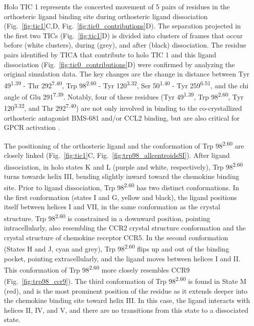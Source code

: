 Holo TIC 1 represents the concerted movement of 5 pairs of residues in the orthosteric ligand binding site during orthosteric ligand dissociation (Fig.~\ref{fig:tic1}C,D, Fig.~\ref{fig:tic0_contributions}D).
The separation projected in the first two TICs (Fig.~\ref{fig:tic1}D) is divided into clusters of frames that occur before (white clusters), during (grey), and after (black) dissociation.
The residue pairs identified by TICA that contribute to holo TIC 1 and this ligand dissociation (Fig.~\ref{fig:tic0_contributions}D) were confirmed by analyzing the original simulation data.
The key changes are the change in distance between Tyr 49\textsuperscript{1.39} - Thr 292\textsuperscript{7.40}, Trp 98\textsuperscript{2.60} - Tyr 120\textsuperscript{3.32}, Ser 50\textsuperscript{1.40} - Tyr 259\textsuperscript{6.51}, and the chi angle of Glu 291\textsuperscript{7.39}.
Notably, four of these residues (Tyr 49\textsuperscript{1.39}, Trp 98\textsuperscript{2.60}, Tyr 120\textsuperscript{3.32}, and Thr 292\textsuperscript{7.40}) are not only involved in binding to the co-crystallized orthosteric antagonist BMS-681 and/or CCL2 binding, but are also critical for GPCR activation \cite{Berkhout2003, Hall2009}.

The positioning of the orthosteric ligand and the conformation of Trp 98\textsuperscript{2.60} are closely linked (Fig.~\ref{fig:tic1}C, Fig.~\ref{fig:trp98_allcentroidsSI}).
After ligand dissociation, in holo states K and L (purple and white, respectively), Trp 98\textsuperscript{2.60} turns towards helix III, bending slightly inward toward the chemokine binding site.
Prior to ligand dissociation, Trp 98\textsuperscript{2.60} has two distinct conformations.
In the first conformation (states I and G, yellow and black), the ligand positions itself between helices I and VII, in the same conformation as the crystal structure.
Trp 98\textsuperscript{2.60} is constrained in a downward position, pointing intracellularly, also resembling the CCR2 crystal structure conformation and the crystal structure of chemokine receptor CCR5.
In the second conformation (States H and J, cyan and grey), Trp 98\textsuperscript{2.60} flips up and out of the binding pocket, pointing extracellularly, and the ligand moves between helices I and II.
This conformation of Trp 98\textsuperscript{2.60} more closely resembles CCR9 (Fig.~\ref{fig:trp98_ccr9}).
The third conformation of Trp 98\textsuperscript{2.60} is found in State M (red), and is the most prominent position of the residue as it extends deeper into the chemokine binding site toward helix III.
In this case, the ligand interacts with helices II, IV, and V, and there are no transitions from this state to a dissociated state.

